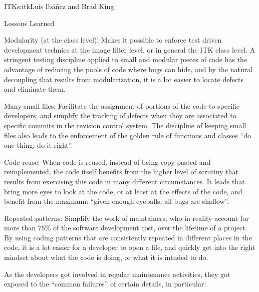 \begin{aosachapter}{ITK}{s:itk}{Luis Ib\'{a}\~{n}ez and Brad King}
\begin{aosasect1}{Lessons Learned}
\begin{aosaitemize}
\item Modularity (at the class level): Makes it possible to enforce test
driven development technics at the image filter level, or in general
the ITK class level. A stringent testing discipline applied to small
and modular pieces of code has the advantage of reducing the pools of
code where bugs can hide, and by the natural decoupling that results
from modularization, it is a lot easier to locate defects and
eliminate them.
\item Many small files: Facilitate the assignment of portions of the
code to specific developers, and simplify the tracking of defects when
they are associated to specific commits in the revision control
system. The discipline of keeping small files also leads to the
enforcement of the golden rule of functions and classes ``do one
thing, do it right''.
\item Code reuse: When code is reused, instead of being copy pasted
and reimplemented, the code itself benefits from the higher level of
scrutiny that results from exercising this code in many different
circumstances. It leads that bring more eyes to look at the code, or
at least at the effects of the code, and benefit from the maximum:
``given enough eyeballs, all bugs are shallow''.
\item Repeated patterns: Simplify the work of maintainers, who in reality account for more than $75\%$ of the
software development cost, over the lifetime of a project. By using
coding patterns that are consistently repeated in different places in
the code, it is a lot easier for a developer to open a file, and
quickly get into the right mindset about what the code is doing, or
what it is intnded to do.
\end{aosaitemize}

As the developers got involved in regular maintenance activities, they
got exposed to the ``common failures'' of certain details, in particular:


\end{aosasect1}
\end{aosachapter}
